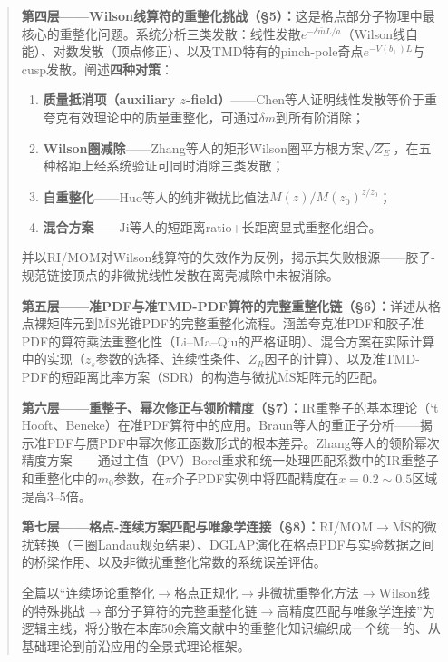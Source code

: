 \documentclass[12pt,a4paper]{ctexart}
\theoremstyle{definition}
\begin{document}
\begin{abstract}
\textbf{第四层——Wilson线算符的重整化挑战（§5）：}这是格点部分子物理中最核心的重整化问题。系统分析三类发散：线性发散$e^{-\delta\bar m L/a}$（Wilson线自能）、对数发散（顶点修正）、以及TMD特有的pinch-pole奇点$e^{-V(b_\perp)L}$与cusp发散。阐述\textbf{四种对策}：
\begin{enumerate}[nosep]
  \item \textbf{质量抵消项（auxiliary $z$-field）}——Chen等人证明线性发散等价于重夸克有效理论中的质量重整化，可通过$\delta m$到所有阶消除；
  \item \textbf{Wilson圈减除}——Zhang等人的矩形Wilson圈平方根方案$\sqrt{Z_E}$，在五种格距上经系统验证可同时消除三类发散；
  \item \textbf{自重整化}——Huo等人的纯非微扰比值法$M(z)/M(z_0)^{z/z_0}$；
  \item \textbf{混合方案}——Ji等人的短距离ratio+长距离显式重整化组合。
\end{enumerate}
并以RI/MOM对Wilson线算符的失效作为反例，揭示其失败根源——胶子-规范链接顶点的非微扰线性发散在离壳减除中未被消除。

\textbf{第五层——准PDF与准TMD-PDF算符的完整重整化链（§6）：}详述从格点裸矩阵元到$\overline{\text{MS}}$光锥PDF的完整重整化流程。涵盖夸克准PDF和胶子准PDF的算符乘法重整化性（Li--Ma--Qiu的严格证明）、混合方案在实际计算中的实现（$z_s$参数的选择、连续性条件、$Z_R$因子的计算）、以及准TMD-PDF的短距离比率方案（SDR）的构造与微扰$\overline{\text{MS}}$矩阵元的匹配。

\textbf{第六层——重整子、幂次修正与领阶精度（§7）：}IR重整子的基本理论（`t Hooft、Beneke）在准PDF算符中的应用。Braun等人的重正子分析——揭示准PDF与赝PDF中幂次修正函数形式的根本差异。Zhang等人的领阶幂次精度方案——通过主值（PV）Borel重求和统一处理匹配系数中的IR重整子和重整化中的$m_0$参数，在$\pi$介子PDF实例中将匹配精度在$x=0.2\sim0.5$区域提高3--5倍。

\textbf{第七层——格点-连续方案匹配与唯象学连接（§8）：}RI/MOM$\to\overline{\text{MS}}$的微扰转换（三圈Landau规范结果）、DGLAP演化在格点PDF与实验数据之间的桥梁作用、以及非微扰重整化常数的系统误差评估。

全篇以``连续场论重整化$\to$格点正规化$\to$非微扰重整化方法$\to$Wilson线的特殊挑战$\to$部分子算符的完整重整化链$\to$高精度匹配与唯象学连接''为逻辑主线，将分散在本库50余篇文献中的重整化知识编织成一个统一的、从基础理论到前沿应用的全景式理论框架。
\end{abstract}

\tableofcontents
\newpage

\end{document}
